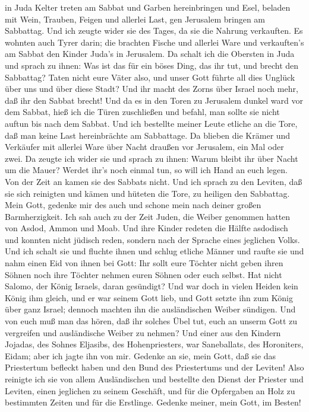 in Juda Kelter treten am Sabbat und Garben hereinbringen und Esel,
beladen mit Wein, Trauben, Feigen und allerlei Last, gen Jerusalem
bringen am Sabbattag. Und ich zeugte wider sie des Tages, da sie die
Nahrung verkauften.  Es wohnten auch Tyrer darin; die
brachten Fische und allerlei Ware und verkauften's am Sabbat den Kinder
Juda's in Jerusalem.  Da schalt ich die Obersten in Juda
und sprach zu ihnen: Was ist das für ein böses Ding, das ihr tut, und
brecht den Sabbattag?  Taten nicht eure Väter also, und
unser Gott führte all dies Unglück über uns und über diese Stadt? Und
ihr macht des Zorns über Israel noch mehr, daß ihr den Sabbat brecht!
 Und da es in den Toren zu Jerusalem dunkel ward vor dem
Sabbat, hieß ich die Türen zuschließen und befahl, man sollte sie nicht
auftun bis nach dem Sabbat. Und ich bestellte meiner Leute etliche an
die Tore, daß man keine Last hereinbrächte am Sabbattage. 
Da blieben die Krämer und Verkäufer mit allerlei Ware über Nacht draußen
vor Jerusalem, ein Mal oder zwei.  Da zeugte ich wider sie
und sprach zu ihnen: Warum bleibt ihr über Nacht um die Mauer? Werdet
ihr's noch einmal tun, so will ich Hand an euch legen. Von der Zeit an
kamen sie des Sabbats nicht.  Und ich sprach zu den
Leviten, daß sie sich reinigten und kämen und hüteten die Tore, zu
heiligen den Sabbattag. Mein Gott, gedenke mir des auch und schone mein
nach deiner großen Barmherzigkeit.  Ich sah auch zu der
Zeit Juden, die Weiber genommen hatten von Asdod, Ammon und Moab.
 Und ihre Kinder redeten die Hälfte asdodisch und konnten
nicht jüdisch reden, sondern nach der Sprache eines jeglichen Volks.
 Und ich schalt sie und fluchte ihnen und schlug etliche
Männer und raufte sie und nahm einen Eid von ihnen bei Gott: Ihr sollt
eure Töchter nicht geben ihren Söhnen noch ihre Töchter nehmen euren
Söhnen oder euch selbst.  Hat nicht Salomo, der König
Israels, daran gesündigt? Und war doch in vielen Heiden kein König ihm
gleich, und er war seinem Gott lieb, und Gott setzte ihn zum König über
ganz Israel; dennoch machten ihn die ausländischen Weiber sündigen.
 Und von euch muß man das hören, daß ihr solches Übel tut,
euch an unserm Gott zu vergreifen und ausländische Weiber zu nehmen?
 Und einer aus den Kindern Jojadas, des Sohnes Eljasibs,
des Hohenpriesters, war Saneballats, des Horoniters, Eidam; aber ich
jagte ihn von mir.  Gedenke an sie, mein Gott, daß sie das
Priestertum befleckt haben und den Bund des Priestertums und der
Leviten!  Also reinigte ich sie von allem Ausländischen und
bestellte den Dienst der Priester und Leviten, einen jeglichen zu seinem
Geschäft,  und für die Opfergaben an Holz zu bestimmten
Zeiten und für die Erstlinge. Gedenke meiner, mein Gott, im Besten!
